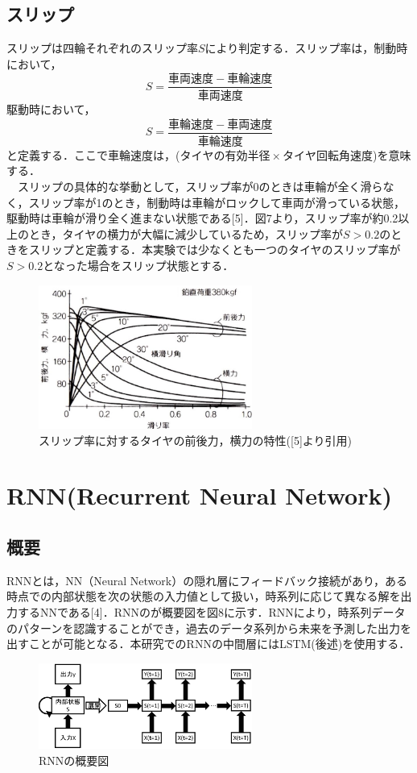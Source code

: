 \documentclass[twocolumn]{jsarticle}
\begin{document}
\subsection{スリップ}
スリップは四輪それぞれのスリップ率$S$により判定する．スリップ率は，制動時において，
   \begin{equation}
   \label{equation2}
      S = \frac{車両速度 - 車輪速度}{車両速度}
   \end{equation}
駆動時において，
   \begin{equation}
   \label{equation3}
      S = \frac{車輪速度 - 車両速度}{車輪速度}
   \end{equation}
と定義する．ここで車輪速度は，($タイヤの有効半径 \times タイヤ回転角速度$)を意味する．
\\　スリップの具体的な挙動として，スリップ率が0のときは車輪が全く滑らなく，スリップ率が1のとき，制動時は車輪がロックして車両が滑っている状態，駆動時は車輪が滑り全く進まない状態である[5]．図7より，スリップ率が約0.2以上のとき，タイヤの横力が大幅に減少しているため，スリップ率が$S > 0.2$のときをスリップと定義する．本実験では少なくとも一つのタイヤのスリップ率が$S > 0.2$となった場合をスリップ状態とする．
\begin{figure}[H]
	\centering
	\includegraphics[width=7cm]{slipratio.jpg}
	\caption{スリップ率に対するタイヤの前後力，横力の特性([5]より引用)}
	\label{fig15}
\end{figure}
\section{RNN(Recurrent Neural Network)}
\subsection{概要}
RNNとは，NN（Neural Network）の隠れ層にフィードバック接続があり，ある時点での内部状態を次の状態の入力値として扱い，時系列に応じて異なる解を出力するNNである[4]．RNNのが概要図を図8に示す．RNNにより，時系列データのパターンを認識することができ，過去のデータ系列から未来を予測した出力を出すことが可能となる．本研究でのRNNの中間層にはLSTM(後述)を使用する．
\begin{figure}[H]
	\centering
	\includegraphics[width=7cm]{RNNdef.PNG}
	\caption{RNNの概要図}
	\label{fig07}
\end{figure}
\end{document}
